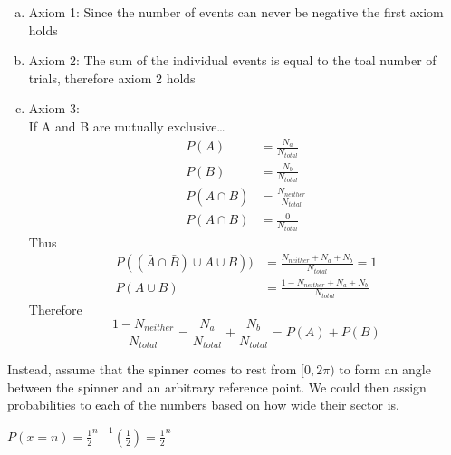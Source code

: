 \documentclass[12pt]{article}
\newenvironment{problem}[2][Problem]{\begin{trivlist}
\item[\hskip \labelsep {\bfseries #1}\hskip \labelsep {\bfseries #2.}]
  \vspace{1 cm}
}{\end{trivlist}}
\begin{document}
\begin{problem}{2.15}
\item%
  \begin{enumerate}[a.]
    \item Axiom 1: Since the number of events can never be negative the first axiom holds
    \item Axiom 2: The sum of the individual events is equal to the toal number of trials, therefore axiom 2 holds
    \item Axiom 3: \\
      If A and B are mutually exclusive\dots \\
      \begin{align*}
        P(A) &= \frac{N_a}{N_{total}} \\
        P(B) &= \frac{N_b}{N_{total}} \\
        P(\bar{A} \cap \bar{B}) &= \frac{N_{neither}}{N_{total}} \\
        P(A \cap B) &= \frac{0}{N_{total}}
      \end{align*}
      Thus \\
      \begin{align*}
        P((\bar{A} \cap \bar{B}) \cup A \cup B)) &= \frac{N_{neither} + N_a + N_b}{N_{total}} = 1 \\
        P(A \cup B) &= \frac{1 - N_{neither} + N_a + N_b}{N_{total}}
      \end{align*}
      Therefore \\
      \begin{equation*}
        \frac{1-N_{neither}}{N_{total}} = \frac{N_a}{N_{total}} + \frac{N_b}{N_{total}} = P(A) + P(B)
      \end{equation*}
  \end{enumerate}%
\end{problem}

\newpage

\begin{problem}{2.17}
\item Instead, assume that the spinner comes to rest from $[0,2\pi)$ to form an angle between the spinner and an arbitrary reference point. We%
    could then assign probabilities to each of the numbers based on how wide their sector is. %
\end{problem}

\begin{problem}{2.19}
\item $P(x = n) = \frac{1}{2}^{n-1}(\frac{1}{2}) = \frac{1}{2}^n$%
\end{problem}%
\end{document}

